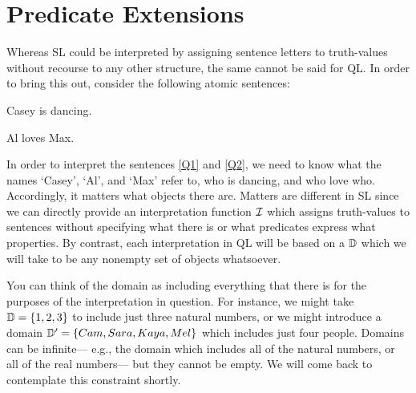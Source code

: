 \section{Predicate Extensions}

Whereas SL could be interpreted by assigning sentence letters to truth-values without recourse to any other structure, the same cannot be said for QL.
In order to bring this out, consider the following atomic sentences:

\begin{earg}
  \item[\ex{Q1}] Casey is dancing.
  \item[\ex{Q2}] Al loves Max.
\end{earg}

In order to interpret the sentences \ref{Q1} and \ref{Q2}, we need to know what the names `Casey', `Al', and `Max' refer to, who is dancing, and who love who.
Accordingly, it matters what objects there are.
Matters are different in SL since we can directly provide an interpretation function $\mathcal{I}$ which assigns truth-values to sentences without specifying what there is or what predicates express what properties.
By contrast, each interpretation in QL will be based on a  $\mathbb{D}$ which we will take to be any nonempty set of objects whatsoever.


You can think of the domain as including everything that there is for the purposes of the interpretation in question.
For instance, we might take $\mathbb{D}=\lbrace1,2,3\rbrace$ to include just three natural numbers, or we might introduce a domain $\mathbb{D}'=\lbrace Cam, Sara, Kaya, Mel\rbrace$ which includes just four people.
Domains can be infinite--- e.g., the domain which includes all of the natural numbers, or all of the real numbers--- but they cannot be empty.
We will come back to contemplate this constraint shortly.

